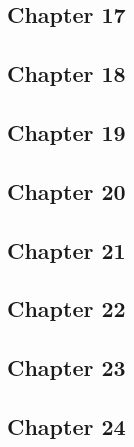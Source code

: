 \subsection*{Chapter 17}







\subsection*{Chapter 18}







\subsection*{Chapter 19}







\subsection*{Chapter 20}







\subsection*{Chapter 21}







\subsection*{Chapter 22}







\subsection*{Chapter 23}







\subsection*{Chapter 24}







